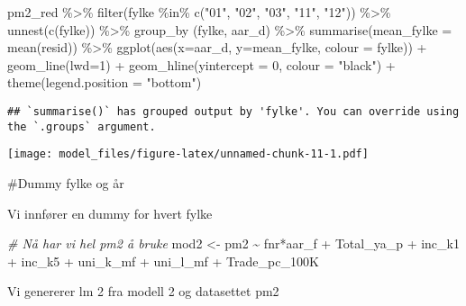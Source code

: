\documentclass[
]{article}
\newenvironment{Shaded}{\begin{snugshade}}{\end{snugshade}}
\newcommand{\AttributeTok}[1]{\textcolor[rgb]{0.77,0.63,0.00}{#1}}
\newcommand{\CommentTok}[1]{\textcolor[rgb]{0.56,0.35,0.01}{\textit{#1}}}
\newcommand{\DecValTok}[1]{\textcolor[rgb]{0.00,0.00,0.81}{#1}}
\newcommand{\FunctionTok}[1]{\textcolor[rgb]{0.00,0.00,0.00}{#1}}
\newcommand{\NormalTok}[1]{#1}
\newcommand{\OtherTok}[1]{\textcolor[rgb]{0.56,0.35,0.01}{#1}}
\newcommand{\SpecialCharTok}[1]{\textcolor[rgb]{0.00,0.00,0.00}{#1}}
\newcommand{\StringTok}[1]{\textcolor[rgb]{0.31,0.60,0.02}{#1}}
\begin{document}
\begin{Shaded}
\begin{Highlighting}[]
\NormalTok{pm2\_red }\SpecialCharTok{\%\textgreater{}\%}
  \FunctionTok{filter}\NormalTok{(fylke }\SpecialCharTok{\%in\%} \FunctionTok{c}\NormalTok{(}\StringTok{"01"}\NormalTok{, }\StringTok{"02"}\NormalTok{, }\StringTok{"03"}\NormalTok{, }\StringTok{"11"}\NormalTok{, }\StringTok{"12"}\NormalTok{)) }\SpecialCharTok{\%\textgreater{}\%}
  \FunctionTok{unnest}\NormalTok{(}\FunctionTok{c}\NormalTok{(fylke)) }\SpecialCharTok{\%\textgreater{}\%}
  \FunctionTok{group\_by}\NormalTok{ (fylke, aar\_d) }\SpecialCharTok{\%\textgreater{}\%}
  \FunctionTok{summarise}\NormalTok{(}\AttributeTok{mean\_fylke =} \FunctionTok{mean}\NormalTok{(resid)) }\SpecialCharTok{\%\textgreater{}\%}
  \FunctionTok{ggplot}\NormalTok{(}\FunctionTok{aes}\NormalTok{(}\AttributeTok{x=}\NormalTok{aar\_d, }\AttributeTok{y=}\NormalTok{mean\_fylke, }\AttributeTok{colour =}\NormalTok{ fylke)) }\SpecialCharTok{+}
  \FunctionTok{geom\_line}\NormalTok{(}\AttributeTok{lwd=}\DecValTok{1}\NormalTok{) }\SpecialCharTok{+}
  \FunctionTok{geom\_hline}\NormalTok{(}\AttributeTok{yintercept =} \DecValTok{0}\NormalTok{, }\AttributeTok{colour =} \StringTok{"black"}\NormalTok{) }\SpecialCharTok{+}
  \FunctionTok{theme}\NormalTok{(}\AttributeTok{legend.position =} \StringTok{"bottom"}\NormalTok{)}
\end{Highlighting}
\end{Shaded}

\begin{verbatim}
## `summarise()` has grouped output by 'fylke'. You can override using the `.groups` argument.
\end{verbatim}

\texttt{[image: model\_files/figure-latex/unnamed-chunk-11-1.pdf]}

\#Dummy fylke og år

Vi innfører en dummy for hvert fylke

\begin{Shaded}
\begin{Highlighting}[]
\CommentTok{\# Nå har vi hel pm2 å bruke}
\NormalTok{mod2 }\OtherTok{\textless{}{-}} \StringTok{\textquotesingle{}pm2 \textasciitilde{} fnr*aar\_f + Total\_ya\_p + inc\_k1 + inc\_k5 + uni\_k\_mf + uni\_l\_mf + Trade\_pc\_100K\textquotesingle{}}
\end{Highlighting}
\end{Shaded}

Vi genererer lm 2 fra modell 2 og datasettet pm2
\end{document}
